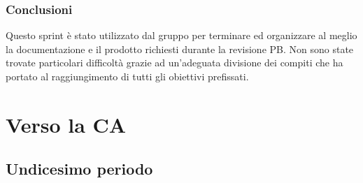 \subsubsection{Conclusioni}
Questo sprint è stato utilizzato dal gruppo per terminare ed organizzare al meglio la documentazione e il prodotto richiesti durante la revisione PB. Non sono state trovate particolari difficoltà grazie ad un'adeguata divisione dei compiti che ha portato al raggiungimento di tutti gli obiettivi prefissati.

\newpage
\section{Verso la CA}

\subsection{Undicesimo periodo}
